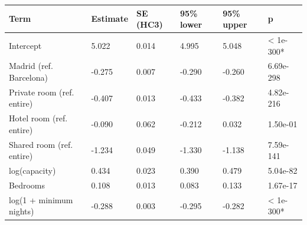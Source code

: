 \begin{tabular}{llllll}
\toprule
Term & Estimate & SE (HC3) & 95\% lower & 95\% upper & p \\
\midrule
Intercept & 5.022 & 0.014 & 4.995 & 5.048 & < 1e-300* \\
Madrid (ref. Barcelona) & -0.275 & 0.007 & -0.290 & -0.260 & 6.69e-298 \\
Private room (ref. entire) & -0.407 & 0.013 & -0.433 & -0.382 & 4.82e-216 \\
Hotel room (ref. entire) & -0.090 & 0.062 & -0.212 & 0.032 & 1.50e-01 \\
Shared room (ref. entire) & -1.234 & 0.049 & -1.330 & -1.138 & 7.59e-141 \\
log(capacity) & 0.434 & 0.023 & 0.390 & 0.479 & 5.04e-82 \\
Bedrooms & 0.108 & 0.013 & 0.083 & 0.133 & 1.67e-17 \\
log(1 + minimum nights) & -0.288 & 0.003 & -0.295 & -0.282 & < 1e-300* \\
\bottomrule
\end{tabular}
